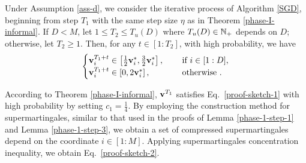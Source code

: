 \begin{theorem}\label{phase-2-step-1}
    Under Assumption \ref{ass-d}, we consider the iterative process of Algorithm \ref{SGD}, beginning from step $T_1$ with the same step size $\eta$ as in Theorem \ref{phase-I-informal}. If $D<M$, let $1\leq T_2\leq T_u(D)$ where $T_u(D)\in\mathbb{N}_+$ depends on $D$; otherwise, let $T_2\geq 1$. Then, for any $t\in[1:T_2]$, with high probability, we have
    \begin{align}\label{proof-sketch-2}
        \begin{cases}
            \mathbf{v}_i^{T_1+t}\in\left[\frac{1}{2}\mathbf{v}_i^*,\frac{3}{2}\mathbf{v}_i^*\right],\quad &\text{ if }i\in[1:D],
            \\
            \mathbf{v}_i^{T_1+t}\in\left[0, 2\mathbf{v}_i^*\right],\quad &\text{ otherwise }.
        \end{cases}
    \end{align}
\end{theorem}
According to Theorem \ref{phase-I-informal}, $\mathbf{v}^{T_1}$ satisfies Eq.~\eqref{proof-sketch-1} with high probability by setting $c_1 = \frac{1}{4}$. By employing the construction method for supermartingales, similar to that used in the proofs of Lemma \ref{phase-1-step-1} and Lemma \ref{phase-1-step-3}, we obtain a set of compressed supermartingales depend on the coordinate $i\in[1:M]$. Applying supermartingales concentration inequality, we obtain Eq.~\eqref{proof-sketch-2}.

